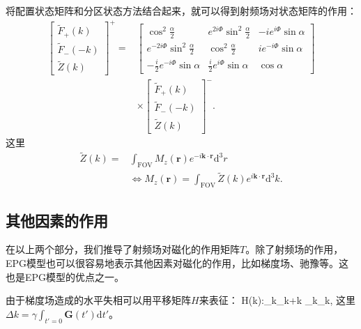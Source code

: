 将配置状态矩阵和分区状态方法结合起来，就可以得到射频场对状态矩阵的作用：
 \begin{align}
 \left[
  \begin{matrix}
   \tilde{F}_+(k) \\
   \tilde{F}_-(-k) \\
   \tilde{Z}(k)
   \end{matrix}
   \right]^+
   =&
   \left[
  \begin{matrix}
   \cos^2\frac{\alpha}{2} & e^{2i\Phi}\sin^2\frac{\alpha}{2} & -ie^{i\Phi}\sin\alpha \\
   e^{-2i\Phi}\sin^2\frac{\alpha}{2} & \cos^2\frac{\alpha}{2} & ie^{-i\Phi}\sin\alpha \\
   -\frac{i}{2}e^{-i\Phi}\sin\alpha & \frac{i}{2}e^{i\Phi}\sin\alpha & \cos\alpha
   \end{matrix}
   \right]\nonumber \\
   & \times \left[
  \begin{matrix}
   \tilde{F}_+(k) \\
   \tilde{F}_-(-k) \\
   \tilde{Z}(k)
   \end{matrix}
   \right]^-.
 \end{align}
 这里
 \begin{align} 
 \tilde{Z}(k)=&\int_{\mathrm{FOV}}M_z(\textbf{r})e^{-i\textbf{k} \cdot \textbf{r}}\mathrm{d}^3r\nonumber\\ &\Longleftrightarrow
 M_z(\textbf{r})=\int_{\mathrm{FOV}}\tilde{Z}(k)e^{i\textbf{k} \cdot \textbf{r}}\mathrm{d}^3k.
 \end{align}
 
 \subsection{其他因素的作用}
 在以上两个部分，我们推导了射频场对磁化的作用矩阵$T$。除了射频场的作用，EPG模型也可以很容易地表示其他因素对磁化的作用，比如梯度场、驰豫等。这也是EPG模型的优点之一。
 
 由于梯度场造成的水平失相可以用平移矩阵$H$来表征：
 \beq H(\Delta k):\quad{}_k\rightarrow{}_{k+\Delta k} \quad{} \quad {}_k\rightarrow{}_k,\eeq 
 这里$\Delta k=\gamma\int_{t'=0}\textbf{G}(t')\mathrm{d}t'$。
 
